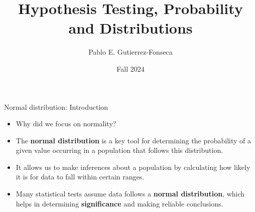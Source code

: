 \documentclass[
  ignorenonframetext,
]{beamer}
\title{Hypothesis Testing, Probability and Distributions}
\author{Pablo E. Gutierrez-Fonseca}
\date{Fall 2024}
\providecommand{\tightlist}{%
  \setlength{\itemsep}{0pt}\setlength{\parskip}{0pt}}
\begin{document}
\frame{\titlepage}

\begin{frame}{Normal distribution: Introduction}
\label{normal-distribution-introduction}
\begin{itemize}
\tightlist
\item
  Why did we focus on normality?
\end{itemize}

\begin{itemize}
\tightlist
\item
  The \textbf{normal distribution} is a key tool for determining the
  probability of a given value occurring in a population that follows
  this distribution.
\end{itemize}

\begin{itemize}
\tightlist
\item
  It allows us to make inferences about a population by calculating how
  likely it is for data to fall within certain ranges.
\end{itemize}

\begin{itemize}
\tightlist
\item
  Many statistical tests assume data follows a \textbf{normal
  distribution}, which helps in determining \textbf{significance} and
  making reliable conclusions.
\end{itemize}
\end{frame}
\end{document}
